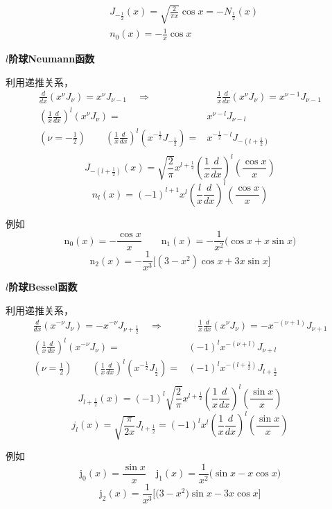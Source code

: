 $$\begin{aligned}
    &J_{-\frac{1}{2}}(x)=\sqrt{\frac{2}{\pi x}}\cos x=-N_{\frac{1}{2}}(x)\\
    &n_{0}(x)=-\frac{1}{x}\cos x 
\end{aligned}$$

\noindent \textbf{$l$阶球Neumann函数}

利用递推关系，
$$\begin{aligned}
    \frac{d}{dx}(x^{\nu}J_{\nu})=x^{\nu}J_{\nu-1}\quad\Rightarrow&\quad\frac{1}{x}\frac{d}{dx}(x^{\nu}J_{\nu})=x^{\nu-1}J_{\nu-1}\\
    (\frac{1}{x}\frac{d}{dx})^{l}(x^{\nu}J_{\nu})=&x^{\nu-l}J_{\nu-l}\\
    (\nu=-\frac{1}{2})\qquad(\frac{1}{x}\frac{d}{dx})^{l}(x^{-\frac{1}{2}}J_{-\frac{1}{2}})=&x^{-\frac{1}{2}-l}J_{-(l+\frac{1}{2})}\\
\end{aligned}$$
$$J_{-(l+\frac{1}{2})}(x)=\sqrt{\frac{2}{\pi}}x^{l+\frac{1}{2}}(\frac{1}{x}\frac{d}{dx})^{l}\left(\frac{\cos x}{x}\right)$$
$$\boxed{n_{l}(x)=(-1)^{l+1}x^{l}(\frac{l}{x}\frac{d}{dx})^{l}(\frac{\cos x}{x})}$$

例如
$$\mathrm{n}_0(x)=-\frac{\cos x}{x}\qquad\mathrm{n}_1(x)=-\frac{1}{x^2}\big(\cos x+x\sin x\big)$$
$$\mathrm{n}_2(x)=-\frac{1}{x^3}\Big[\left(3-x^2\right)\cos x+3x\sin x\Big]$$

\noindent \textbf{$l$阶球Bessel函数}

利用递推关系，
$$\begin{aligned}
    \frac{d}{dx}(x^{-\nu}J_{\nu})=-x^{-\nu}J_{\nu+\frac{1}{2}}\quad\Rightarrow&\quad\frac{1}{x}\frac{d}{dx}(x^{\nu}J_{\nu})=-x^{-(\nu+1)}J_{\nu+1}\\   
    (\frac{1}{x}\frac{d}{dx})^{l}(x^{-\nu}J_{\nu})=&(-1)^{l}x^{-(\nu+l)}J_{\nu+l}\\
    (\nu=\frac{1}{2})\qquad(\frac{1}{x}\frac{d}{dx})^{l}(x^{-\frac{1}{2}}J_{\frac{1}{2}})=&(-1)^{l}x^{-(l+\frac{1}{2})}J_{l+\frac{1}{2}}\\
\end{aligned}$$
$$J_{l+\frac{1}{2}}(x)=(-1)^{l}\sqrt{\frac{2}{\pi}}x^{l+\frac{1}{2}}(\frac{1}{x}\frac{d}{dx})^{l}(\frac{\sin x}{x})$$
$$\boxed{j_{l}(x)=\sqrt{\frac{\pi}{2x}}J_{l+\frac{1}{2}}=(-1)^{l}x^{l}(\frac{1}{x}\frac{d}{dx})^{l}(\frac{\sin x}{x})}$$

例如
$$\mathrm{j}_{0}(x)=\frac{\sin x}{x}\quad\mathrm{j}_{1}(x)=\frac{1}{x^{2}}\big(\sin x-x\cos x\big)$$
$$\mathrm{j}_{2}(x)=\frac{1}{x^{3}}\Big[\big(3-x^{2}\big)\sin x-3x\cos x\Big]$$

